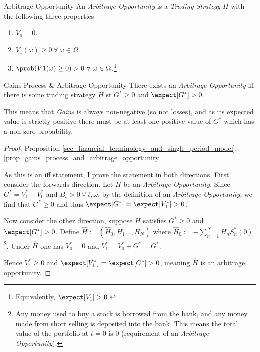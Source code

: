 \documentclass[11pt,a4paper]{article}
\begin{document}
  \begin{definition}{Arbitrage Opportunity}
    An \textit{Arbitrage Opportunity} is a \textit{Trading Strategy} $H$ with the following three properties
    \begin{enumerate}
      \item $V_0=0$.
      \item $V_1(\omega)\geq0\ \forall\ \omega\in\Omega$.
      \item $\prob(V1(\omega)\geq0)>0\ \forall\ \omega\in\Omega$.\footnote{Equivalently, $\expect[V_1]>0$.}
    \end{enumerate}
  \end{definition}

  \begin{proposition}{Gains Process \& Arbitrage Opportunity}\label{prop_gains_process_and_arbitrage_opportunity}
    There exists an \textit{Arbitrage Opportunity} iff there is some trading strategy $H$ st $G^*\geq0$ and $\expect[G^*]>0$.
    \par This means that \textit{Gains} is always non-negative (so not losses), and as its expected value is strictly positive there must be at least one positive value of $G^*$ which has a non-zero probability.
  \end{proposition}

  \begin{proof}{Proposition \ref{sec_financial_terminology_and_single_period_model}.\ref{prop_gains_process_and_arbitrage_opportunity}}
    \par As this is an \underline{iff} statement, I prove the statement in both directions.
    First consider the forwards direction. Let $H$ be an \textit{Arbitrage Opportunity}. Since $G^*=V_1^*-V_0^*$ and $B_t>0\ \forall\ t,\omega$, by the definition of an \textit{Arbitrage Opportunity}, we find that $G^*\geq0$ and thus $\expect[G^*]=\expect[V_1^*]>0$.
    \par Now consider the other direction, suppose $H$ satisfies $G^*\geq0$ and $\expect[G^*]>0$. Define $\hat{H}:=(\hat{H}_0,H_1\dots,H_N)$ where $\hat{H}_0:=-\sum_{n=1}^NH_nS_n^*(0)$\footnote{Any money used to buy a stock is borrowed from the bank, and any money made from short selling is deposited into the bank. This means the total value of the portfolio at $t=0$ is $0$ (requirement of an \textit{Arbitrage Opportunity}).}. Under $\hat{H}$ one has $V_0^*=0$ and $V_1^*=V_0^*+G^*=G^*$.
    \par Hence $V_1^*\geq0$ and $\expect[V_1^*]=\expect[G^*]>0$, meaning $\hat{H}$ is an arbitrage opportunity.
  \end{proof}
\end{document}
